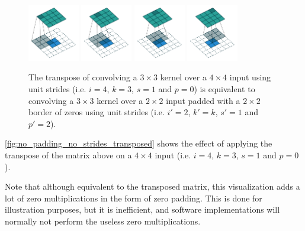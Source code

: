 \documentclass{article}
\begin{document}
\begin{figure}[h]
    \centering
    \includegraphics[width=0.2\textwidth]
        {pdf/no_padding_no_strides_transposed_00.pdf}
    \includegraphics[width=0.2\textwidth]
        {pdf/no_padding_no_strides_transposed_01.pdf}
    \includegraphics[width=0.2\textwidth]
        {pdf/no_padding_no_strides_transposed_02.pdf}
    \includegraphics[width=0.2\textwidth]
        {pdf/no_padding_no_strides_transposed_03.pdf}
    \caption{\label{fig:no_padding_no_strides_transposed} The transpose of
        convolving a $3 \times 3$ kernel over a $4 \times 4$ input using unit
        strides (i.e. $i = 4$, $k = 3$, $s = 1$ and $p = 0$) is equivalent to
        convolving a $3 \times 3$ kernel over a $2 \times 2$ input padded with
        a $2 \times 2$ border of zeros using unit strides (i.e. $i' = 2$, $k' =
        k$, $s' = 1$ and $p' = 2$).}
\end{figure}

\autoref{fig:no_padding_no_strides_transposed} shows the effect of applying the
transpose of the matrix above on a $4 \times 4$ input (i.e. $i = 4$, $k = 3$, $s
= 1$ and $p = 0$).

Note that although equivalent to the transposed matrix, this visualization adds
a lot of zero multiplications in the form of zero padding. This is done for
illustration purposes, but it is inefficient, and software implementations will
normally not perform the useless zero multiplications.
\end{document}
